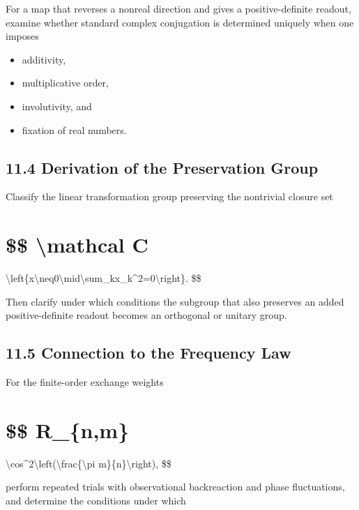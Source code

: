 \documentclass[
  a4paper,
  10pt]{article}
\providecommand{\tightlist}{%
  \setlength{\itemsep}{0pt}\setlength{\parskip}{0pt}}
\begin{document}
For a map that reverses a nonreal direction and gives a
positive-definite readout, examine whether standard complex conjugation
is determined uniquely when one imposes

\begin{itemize}
\tightlist
\item
  additivity,
\item
  multiplicative order,
\item
  involutivity, and
\item
  fixation of real numbers.
\end{itemize}

\subsection{11.4 Derivation of the Preservation
Group}\label{114-derivation-of-the-preservation-group}

Classify the linear transformation group preserving the nontrivial
closure set

\section{\$\$ \textbackslash mathcal C}\label{-mathcal-c}

\textbackslash left\{x\textbackslash neq0\textbackslash mid\textbackslash sum\_kx\_k\^{}2=0\textbackslash right\}.
\$\$

Then clarify under which conditions the subgroup that also preserves an
added positive-definite readout becomes an orthogonal or unitary group.

\subsection{11.5 Connection to the Frequency
Law}\label{115-connection-to-the-frequency-law}

For the finite-order exchange weights

\section{\$\$ R\_\{n,m\}}\label{-r_nm}

\textbackslash cos\^{}2\textbackslash left(\textbackslash frac\{\textbackslash pi
m\}\{n\}\textbackslash right), \$\$

perform repeated trials with observational backreaction and phase
fluctuations, and determine the conditions under which
\end{document}
